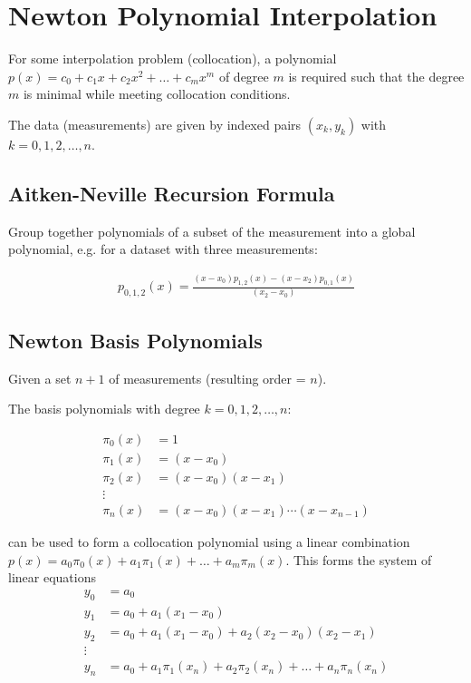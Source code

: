 \section{Newton Polynomial Interpolation}

For some interpolation problem (collocation), a polynomial
$p(x) = c_0 + c_1x + c_2x^2 + \ldots + c_mx^m$
of degree $m$ is required such that the degree $m$ is minimal while meeting collocation conditions.

The data (measurements) are given by indexed pairs $(x_k,y_k)$ with $k=0,1,2,\ldots,n$.

\subsection{Aitken-Neville Recursion Formula}

Group together polynomials of a subset of the measurement into a global polynomial, e.g. for a dataset with three measurements:

\begin{align*}
    p_{0,1,2}(x)=\frac{(x-x_0)p_{1,2}(x) - (x-x_2)p_{0,1}(x)}{(x_2-x_0)}
\end{align*}

\subsection{Newton Basis Polynomials}
Given a set $n+1$ of measurements (resulting order = $n$).

The basis polynomials with degree $k=0,1,2,\ldots,n$:

\begin{snugshade*}
    \begin{align*}
        \pi_0(x) & = 1 \\
        \pi_1(x) & = (x-x_0) \\
        \pi_2(x) & = (x-x_0)(x-x_1) \\
        \vdots \\
        \pi_n(x) & = (x-x_0)(x-x_1)\cdots(x-x_{n-1})
    \end{align*}
\end{snugshade*}

can be used to form a collocation polynomial using a linear combination
$p(x)=a_0\pi_0(x) + a_1\pi_1(x) + \ldots + a_m\pi_m(x)$.
This forms the system of linear equations
\begin{align*}
    y_0 & = a_0 \\
    y_1 & = a_0 + a_1(x_1-x_0) \\
    y_2 & = a_0 + a_1(x_1-x_0) + a_2(x_2-x_0)(x_2-x_1) \\
    \vdots \\
    y_n & = a_0+a_1\pi_1(x_n)+a_2\pi_2(x_n)+\ldots+a_n\pi_n(x_n)
\end{align*}

